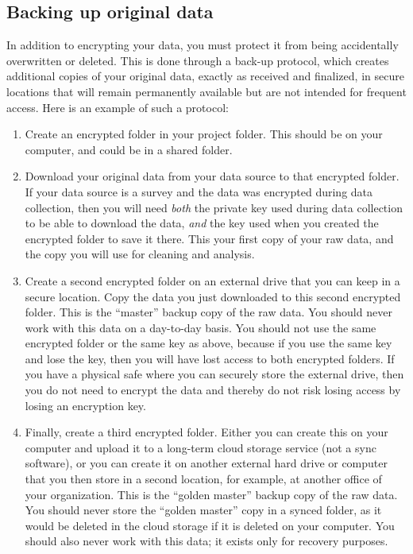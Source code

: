 \subsection{Backing up original data}
In addition to encrypting your data, you must protect it
from being accidentally overwritten or deleted.
This is done through a back-up protocol,
which creates additional copies of your original data,
exactly as received and finalized,
in secure locations that will remain permanently available
but are not intended for frequent access.
Here is an example of such a protocol:

\begin{enumerate}
	\item Create an encrypted folder in your project folder.
	This should be on your computer, and could be in a shared folder.

	\item Download your original data from your data source to that encrypted folder.
	If your data source is a survey and the data was encrypted during data collection,
	then you will need \textit{both} the
	private key used during data collection to be able to download the data,
	\textit{and} the key used when you created the encrypted folder to save it there.
	This your first copy of your raw data, and the copy you will use for cleaning and analysis.

	\item Create a second encrypted folder on an external drive that you can keep in a secure location.
	Copy the data you just downloaded to this second encrypted folder.
	This is the ``master'' backup copy of the raw data.
	You should never work with this data on a day-to-day basis.
	You should not use the same encrypted folder or the same key as above,
	because if you use the same key and lose the key,
	then you will have lost access to both encrypted folders.
	If you have a physical safe where you can securely store the external drive,
	then you do not need to encrypt the data
	and thereby do not risk losing access by losing an encryption key.

	\item Finally, create a third encrypted folder.
	Either you can create this on your computer and upload it to a long-term cloud storage service (not a sync software),
	or you can create it on	another external hard drive or computer that you then store in a second location,
	for example, at another office of your organization.
	This is the ``golden master'' backup copy of the raw data.
	You should never store the ``golden master'' copy in a synced folder,
	as it would be deleted in the cloud storage if it is deleted on your computer.
	You should also never work with this data;
	it exists only for recovery purposes.
\end{enumerate}

